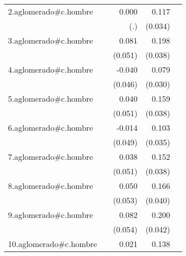 {\begin{longtable}{l*{4}{D{.}{.}{-1}}}
\addlinespace
2.aglomerado#c.hombre&                     &       0.000         &       0.117\sym{***}&                     \\
            &                     &         (.)         &     (0.034)         &                     \\
\addlinespace
3.aglomerado#c.hombre&                     &       0.081         &       0.198\sym{***}&                     \\
            &                     &     (0.051)         &     (0.038)         &                     \\
\addlinespace
4.aglomerado#c.hombre&                     &      -0.040         &       0.079\sym{**} &                     \\
            &                     &     (0.046)         &     (0.030)         &                     \\
\addlinespace
5.aglomerado#c.hombre&                     &       0.040         &       0.159\sym{***}&                     \\
            &                     &     (0.051)         &     (0.038)         &                     \\
\addlinespace
6.aglomerado#c.hombre&                     &      -0.014         &       0.103\sym{**} &                     \\
            &                     &     (0.049)         &     (0.035)         &                     \\
\addlinespace
7.aglomerado#c.hombre&                     &       0.038         &       0.152\sym{***}&                     \\
            &                     &     (0.051)         &     (0.038)         &                     \\
\addlinespace
8.aglomerado#c.hombre&                     &       0.050         &       0.166\sym{***}&                     \\
            &                     &     (0.053)         &     (0.040)         &                     \\
\addlinespace
9.aglomerado#c.hombre&                     &       0.082         &       0.200\sym{***}&                     \\
            &                     &     (0.054)         &     (0.042)         &                     \\
\addlinespace
10.aglomerado#c.hombre&                     &       0.021         &       0.138\sym{***}&                     \\

\end{longtable}}

